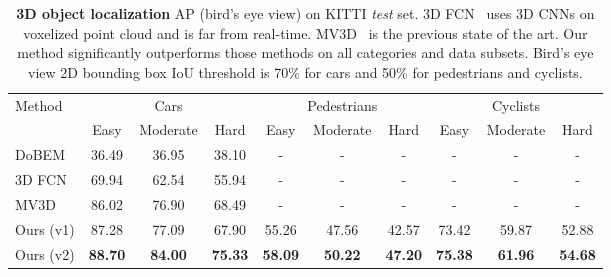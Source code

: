 \begin{table}[t!]
\small
\centering
\begin{tabular}{l||ccc||ccc||ccc}
\hline
\multirow{2}{*}{Method} & \multicolumn{3}{c||}{Cars} & \multicolumn{3}{c||}{Pedestrians} & \multicolumn{3}{c}{Cyclists} \\ \cline{2-10} 
                        & Easy  & Moderate  & Hard  & Easy     & Moderate    & Hard    & Easy    & Moderate   & Hard   \\ \hline
DoBEM~\cite{yuvehicle} & 36.49 & 36.95 & 38.10 & - & - & - & - & - & - \\
3D FCN~\cite{li20163d} & 69.94 & 62.54 & 55.94 & - & - & - & - & - & - \\
MV3D~\cite{cvpr17chen} & 86.02 & 76.90 & 68.49 & - & - & - & - & - & - \\ \hline
Ours (v1) & 87.28 & 77.09 & 67.90 & 55.26 & 47.56 & 42.57 & 73.42 & 59.87 & 52.88 \\
Ours (v2) & \textbf{88.70} & \textbf{84.00} & \textbf{75.33} & \textbf{58.09} & \textbf{50.22} & \textbf{47.20} & \textbf{75.38} & \textbf{61.96} & \textbf{54.68} \\ \hline
\end{tabular}
\caption{\textbf{3D object localization} AP (bird's eye view) on KITTI \emph{test} set.
3D FCN~\cite{li20163d} uses 3D CNNs on voxelized point cloud and is far from real-time. MV3D~\cite{cvpr17chen} is the previous state of the art.
Our method significantly outperforms those methods on all categories and data subsets. Bird's eye view 2D bounding box IoU threshold is 70\% for cars and 50\% for pedestrians and cyclists.}
\label{tab:kitti_test_3d_localization}

\end{table}

